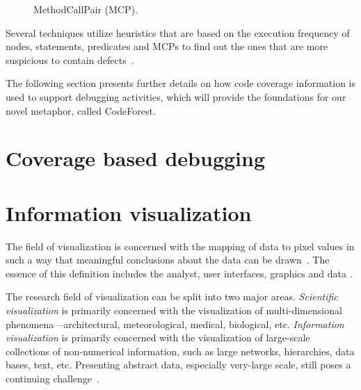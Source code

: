 \begin{figure}[h]
  \centering
  \caption{MethodCallPair (MCP).}
  \label{fig:mcp}
\end{figure}

Several techniques utilize heuristics that are based on the execution frequency
of nodes, statements, predicates and MCPs to find out the ones that are more
suspicious to contain defects~\cite{souza2012depuracao}.

The following section presents further details on how code coverage information
is used to support debugging activities, which will provide the foundations for
our novel metaphor, called CodeForest.

\section{Coverage based debugging}\label{sec:bg-debugging}



\section{Information visualization}\label{sec:bg-infovis}

The field of visualization is concerned with the mapping of data to pixel values
in such a way that meaningful conclusions about the data can be
drawn~\cite[p.~397]{erik2008color}. The essence of this definition includes the
analyst, user interfaces, graphics and data \cite{myatt2009making}.

The research field of visualization can be split into two major areas.
\textit{Scientific visualization} is primarily concerned with the visualization
of multi-dimensional phenomena---architectural, meteorological, medical,
biological, etc. \textit{Information visualization} is primarily concerned with
the visualization of large-scale collections of non-numerical information, such
as large networks, hierarchies, data bases, text, etc. Presenting abstract data,
especially very-large scale, still poses a continuing
challenge~\cite{friendly2001milestones}.

